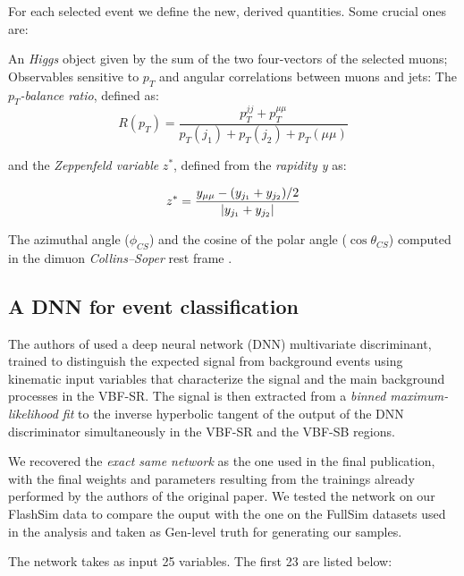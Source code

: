 For each selected event we define the new, derived quantities. Some crucial ones are:

\begin{outline}
\1 An \emph{Higgs} object given by the sum of the two four-vectors of the selected muons;
\1 Observables sensitive to $p_T$ and angular correlations between muons and jets: The $p_T$\emph{-balance ratio}, defined as:
\[R(p_T) = \frac{p_T^{jj}+p_T^{\mu\mu}}{p_T(j_1) + p_T(j_2) + p_T(\mu\mu)}\]

and the \emph{Zeppenfeld variable} $z^*$, defined from the \emph{rapidity y} as:

\[z^* = \frac{y_{\mu\mu} - (y_{j_1} + y_{j_2})/2}{\abs{y_{j_1} + y_{j_2}}}\]

\1  The azimuthal angle ($\phi_{CS}$) and the cosine of the polar angle ($\cos\theta_{CS}$) computed in the dimuon \emph{Collins–Soper} rest frame \cite{PhysRevD.16.2219}.
\end{outline}

\subsection{A DNN for event classification}
The authors of \cite{CMS-PAS-HIG-19-006} used a deep neural network (DNN) multivariate discriminant, trained to distinguish the expected signal from background events using kinematic input variables that characterize the signal and the main background processes in the VBF-SR. The signal is then extracted from a \emph{binned maximum-likelihood fit} to the inverse hyperbolic tangent of the output of the DNN discriminator simultaneously in the VBF-SR and the VBF-SB regions. 

We recovered the \emph{exact same network} as the one used in the final publication, with the final weights and parameters resulting from the trainings already performed by the authors of the original paper. We tested the network on our FlashSim data to compare the ouput with the one on the FullSim datasets used in the analysis and taken as Gen-level truth for generating our samples.

The network takes as input 25 variables. The first 23 are listed below:


